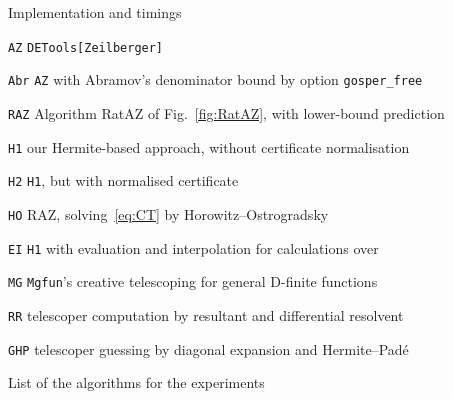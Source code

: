 \documentclass{sig-alt-full}
\begin{document}
\begin{section}{Implementation and timings}
\begin{table}
\vskip-3pt
\begin{scriptsize}
\begin{list}{}{\itemsep-3pt}
\item[\tt AZ] \verb+DETools[Zeilberger]+
\item[\tt Abr] \verb+AZ+ with Abramov's denominator bound by option \verb+gosper_free+
\item[\tt RAZ] Algorithm \textsf{RatAZ} of Fig.~\ref{fig:RatAZ}, with
  lower-bound prediction
\item[\tt H1] our Hermite-based approach, without certificate normalisation
\item[\tt H2] \verb+H1+, but with normalised certificate
\item[\tt HO] \textsf{RAZ}, solving~\eqref{eq:CT} by Horowitz--Ostrogradsky
\item[\tt EI] \verb+H1+ with evaluation and interpolation for calculations over~
\item[\tt MG] \verb+Mgfun+'s creative telescoping for general D-finite functions
\item[\tt RR] telescoper computation by resultant and differential resolvent
\item[\tt GHP] telescoper guessing by diagonal expansion and
  Hermite--Pad\'e
\end{list}
\end{scriptsize}
\vskip-15pt
\caption{List of the algorithms for the experiments}\label{tab:algos}
\vskip-10pt
\end{table}

\end{section}
\end{document}
